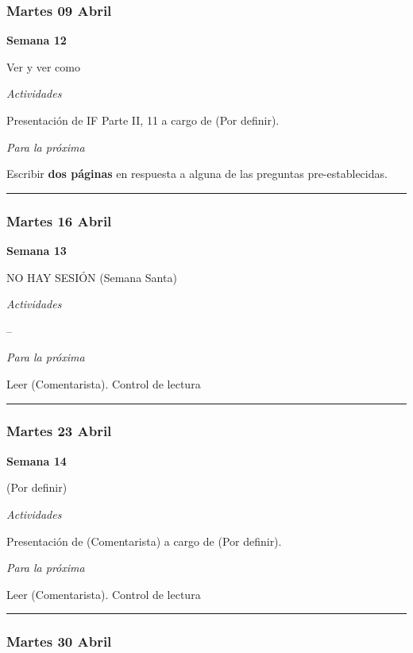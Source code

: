 \documentclass[spanish,]{article}
\begin{document}
\subsubsection{Martes 09 Abril}\label{martes-09-abril}

\textbf{Semana 12}

Ver y ver como

\emph{Actividades}

Presentación de IF Parte II, 11 a cargo de (Por definir).

\emph{Para la próxima}

Escribir \textbf{dos páginas} en respuesta a alguna de las preguntas
pre-establecidas.

\begin{center}\rule{0.5\linewidth}{\linethickness}\end{center}

\subsubsection{Martes 16 Abril}\label{martes-16-abril}

\textbf{Semana 13}

NO HAY SESIÓN (Semana Santa)

\emph{Actividades}

--

\emph{Para la próxima}

Leer (Comentarista). Control de lectura

\begin{center}\rule{0.5\linewidth}{\linethickness}\end{center}

\subsubsection{Martes 23 Abril}\label{martes-23-abril}

\textbf{Semana 14}

(Por definir)

\emph{Actividades}

Presentación de (Comentarista) a cargo de (Por definir).

\emph{Para la próxima}

Leer (Comentarista). Control de lectura

\begin{center}\rule{0.5\linewidth}{\linethickness}\end{center}

\subsubsection{Martes 30 Abril}\label{martes-30-abril}
\end{document}
